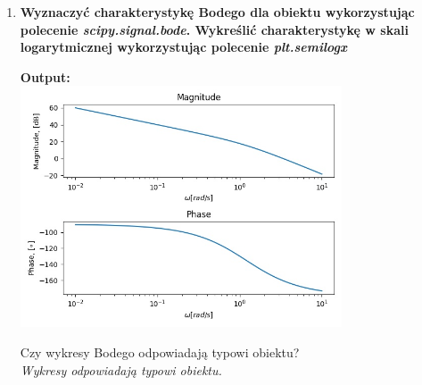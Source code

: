 \documentclass[12pt]{article}
\begin{document}
\begin{enumerate}
        \item\textbf{Wyznaczyć charakterystykę Bodego dla obiektu wykorzystując
        polecenie \emph{scipy.signal.bode}. Wykreślić charakterystykę w skali logarytmicznej
        wykorzystując polecenie \emph{plt.semilogx}}
            \begin{shbox}
                \centering
                \textbf{Output:} \\
                \includegraphics[width=0.75\textwidth]{lab2/zad4_4.jpg}
            \end{shbox}
            Czy wykresy Bodego odpowiadają typowi obiektu?\\
            \emph{Wykresy odpowiadają typowi obiektu.}
        \end{enumerate}
\end{document}
